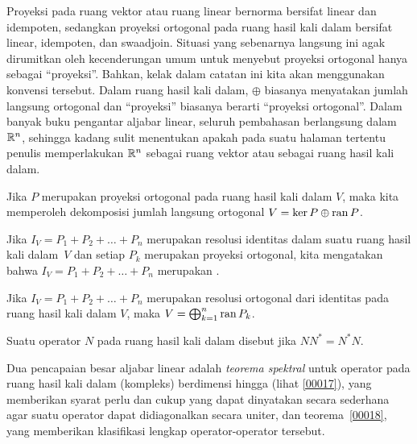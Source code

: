 \begin{cau} Proyeksi pada ruang vektor atau ruang linear bernorma bersifat linear dan idempoten,
sedangkan proyeksi ortogonal pada ruang hasil kali dalam bersifat linear, idempoten, dan
swaadjoin. Situasi yang sebenarnya langsung ini agak dirumitkan oleh kecenderungan umum
untuk menyebut proyeksi ortogonal hanya sebagai ``proyeksi''. Bahkan, kelak dalam catatan
ini kita akan menggunakan konvensi tersebut. Dalam ruang hasil kali dalam,
$\oplus$ biasanya menyatakan jumlah langsung ortogonal dan ``proyeksi'' biasanya berarti
``proyeksi ortogonal''. Dalam banyak buku pengantar aljabar linear, seluruh pembahasan
berlangsung dalam $\mathbb{R}^n$, sehingga kadang sulit menentukan apakah pada suatu halaman
tertentu penulis memperlakukan $\mathbb{R}^n$ sebagai ruang vektor atau sebagai ruang hasil kali
dalam.
\end{cau}

\begin{prop} Jika $P$ merupakan proyeksi ortogonal pada ruang hasil kali dalam $V$, maka kita memperoleh
dekomposisi jumlah langsung ortogonal $V = \ker P \oplus \operatorname{ran} P$.
\end{prop}

\begin{defn} Jika $I_V = P_1 + P_2 + \dots + P_n$ merupakan resolusi identitas dalam suatu
ruang hasil kali dalam~$V$ dan setiap $P_k$ merupakan proyeksi ortogonal, kita mengatakan bahwa $I_V =
P_1 + P_2 + \dots + P_n$ merupakan
.
\end{defn}

\begin{prop} Jika $I_V = P_1 + P_2 + \dots + P_n$ merupakan resolusi ortogonal dari identitas
pada ruang hasil kali dalam $V$, maka $V = \bigoplus_{k=1}^n \operatorname{ran} P_k$.
\end{prop}

\begin{defn} Suatu operator $N$ pada ruang hasil kali dalam disebut
 jika $NN^* = N^*N$.
\end{defn}

Dua pencapaian besar aljabar linear adalah \emph{teorema spektral} untuk operator pada
ruang hasil kali dalam (kompleks) berdimensi hingga (lihat \ref{00017}), yang memberikan
syarat perlu dan cukup yang dapat dinyatakan secara sederhana agar suatu operator dapat
didiagonalkan secara uniter, dan teorema~\ref{00018}, yang memberikan klasifikasi lengkap
operator-operator tersebut.

